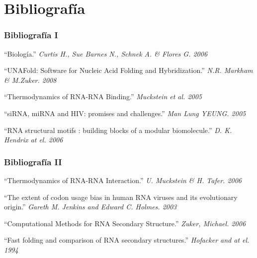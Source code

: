 \section{Bibliografía}
    \begin{frame}\frametitle{\textbf{Bibliografía I}}
  	\begin{thebibliography}{4}
		  \beamertemplatebookbibitems
         “Biología.”
        \newblock \emph{Curtis H., Sue Barnes N., Schnek A. \& Flores G. 2006} 

         “UNAFold: Software for Nucleic Acid Folding and Hybridization.”
        \newblock \emph{N.R. Markham \& M.Zuker. 2008} 
                
         “Thermodynamics of RNA-RNA Binding.”
        \newblock \emph{Muckstein et al. 2005}         

         “siRNA, miRNA and HIV: promises and challenges.”
        \newblock \emph{Man Lung YEUNG. 2005}         

         “RNA structural motifs : building blocks of a modular biomolecule.”
        \newblock \emph{D. K. Hendrix at el. 2006}         
		\end{thebibliography}
    \end{frame} 

    \begin{frame}\frametitle{\textbf{Bibliografía II}}
    \begin{thebibliography}{4}
      \beamertemplatebookbibitems      
         “Thermodynamics of RNA-RNA Interaction.”
        \newblock \emph{U. Muckstein \& H. Tafer. 2006}         

         “The extent of codon usage bias in human RNA viruses and its evolutionary origin.”
        \newblock \emph{Gareth M. Jenkins and Edward C. Holmes. 2003}         

         “Computational Methods for RNA Secondary Structure.”
        \newblock \emph{Zuker, Michael. 2006}         

         “Fast folding and comparison of RNA secondary structures.”
        \newblock \emph{Hofacker and at el. 1994}         
    \end{thebibliography}
    \end{frame}

